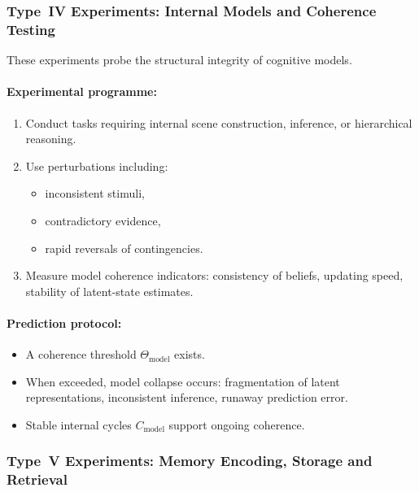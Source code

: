 \subsubsection{Type~IV Experiments: Internal Models and Coherence Testing}

These experiments probe the structural integrity of
cognitive models.

\paragraph{Experimental programme:}

\begin{enumerate}
    \item Conduct tasks requiring internal scene construction,
          inference, or hierarchical reasoning.
    \item Use perturbations including:
          \begin{itemize}
              \item inconsistent stimuli,
              \item contradictory evidence,
              \item rapid reversals of contingencies.
          \end{itemize}
    \item Measure model coherence indicators:
          consistency of beliefs, updating speed, stability of
          latent-state estimates.
\end{enumerate}

\paragraph{Prediction protocol:}

\begin{itemize}
    \item A coherence threshold $\Theta_{\mathrm{model}}$ exists.
    \item When exceeded, model collapse occurs:
          fragmentation of latent representations,
          inconsistent inference,
          runaway prediction error.
    \item Stable internal cycles $C_{\mathrm{model}}$ support
          ongoing coherence.
\end{itemize}



\subsubsection{Type~V Experiments: Memory Encoding, Storage and Retrieval}


